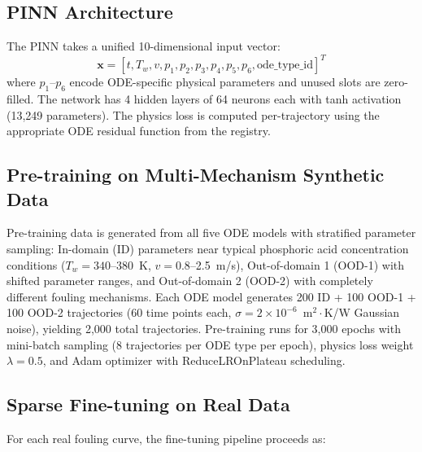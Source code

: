 \documentclass[review]{elsarticle}
\begin{document}
\subsection{PINN Architecture}

The PINN takes a unified 10-dimensional input vector:
\begin{equation}
\mathbf{x} = [t, T_w, v, p_1, p_2, p_3, p_4, p_5, p_6, \text{ode\_type\_id}]^T
\end{equation}
where $p_1$--$p_6$ encode ODE-specific physical parameters and unused slots are zero-filled. The network has 4 hidden layers of 64 neurons each with tanh activation (13,249 parameters). The physics loss is computed per-trajectory using the appropriate ODE residual function from the registry.

\subsection{Pre-training on Multi-Mechanism Synthetic Data}

Pre-training data is generated from all five ODE models with stratified parameter sampling: In-domain (ID) parameters near typical phosphoric acid concentration conditions ($T_w = 340$--380~K, $v = 0.8$--2.5~m/s), Out-of-domain 1 (OOD-1) with shifted parameter ranges, and Out-of-domain 2 (OOD-2) with completely different fouling mechanisms. Each ODE model generates 200 ID + 100 OOD-1 + 100 OOD-2 trajectories (60 time points each, $\sigma = 2 \times 10^{-6}$~m$^2\cdot$K/W Gaussian noise), yielding 2,000 total trajectories. Pre-training runs for 3,000 epochs with mini-batch sampling (8 trajectories per ODE type per epoch), physics loss weight $\lambda = 0.5$, and Adam optimizer with ReduceLROnPlateau scheduling.

\subsection{Sparse Fine-tuning on Real Data}

For each real fouling curve, the fine-tuning pipeline proceeds as:
\end{document}
